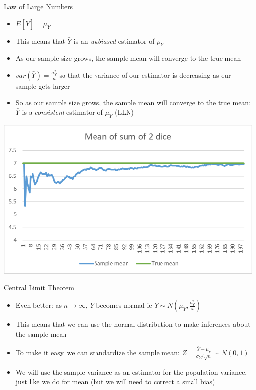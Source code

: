 \documentclass[aspectratio=169]{beamer}
\begin{document}
\begin{frame}{Law of Large Numbers}
    \begin{itemize}
        \item $E[\bar{Y}] = \mu_Y$ 
        \item This means that $\bar{Y}$ is an \textit{unbiased} estimator of $\mu_Y$
        \item As our sample size grows, the sample mean will converge to the true mean
        \item $var(\bar{Y}) = \frac{\sigma_Y^2}{n}$ so that the variance of our estimator is decreasing as our sample gets larger
        \item So as our sample size grows, the sample mean will converge to the true mean: $\bar{Y}$ is a \textit{consistent} estimator of $\mu_Y$ (LLN)
    \end{itemize}
\end{frame}

\begin{frame}
    \centering
    \includegraphics[width = .8\textwidth,keepaspectratio]{LLN.png}
\end{frame}

\begin{frame}{Central Limit Theorem}
    \begin{itemize}
        \item Even better: as $n \to \infty$, $\bar{Y}$ becomes normal ie $\bar{Y} \sim N(\mu_Y,\frac{\sigma_Y^2}{n})$
        \item This means that we can use the normal distribution to make inferences about the sample mean
        \item To make it easy, we can standardize the sample mean: $Z = \frac{\bar{Y} - \mu_Y}{\sigma_Y/\sqrt{n}} \sim N(0,1)$
        \item We will use the sample variance as an estimator for the population variance, just like we do for mean (but we will need to correct a small bias)
    \end{itemize}
\end{frame}
\end{document}
